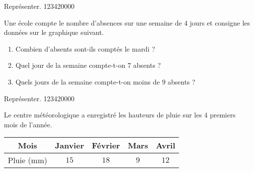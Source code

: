 \begin{pageAD} 


 

\begin{ExoCad}{ Représenter. }{1234}{2}{0}{0}{0}{0}

Une école compte le nombre d'absences sur une semaine de 4 jours et consigne les données sur le graphique suivant.

\begin{minipage}{0.4\linewidth}


\end{minipage}
\begin{minipage}{0.6\linewidth}

\begin{enumerate}[leftmargin=*]
\item Combien d'absents sont-ils comptés le mardi ? 
\item Quel jour de la semaine compte-t-on $7$ absents ?  
\item Quels jours de la semaine compte-t-on moins de $9$ absents ?  
\end{enumerate}
\end{minipage}

\end{ExoCad}



\begin{ExoCad}{ Représenter. }{1234}{2}{0}{0}{0}{0}

Le centre météorologique a enregistré les hauteurs de pluie sur les 4 premiers mois de l'année.

 \begin{center}
 \begin{tabular}{|c|c|c|c|c|}\hline 
  Mois & Janvier & Février & Mars & Avril \\\hline 
  Pluie (mm)& $15$ & $18$ & $9$ & $12$ \\\hline
 \end{tabular}
 \end{center}


\end{ExoCad}
\end{pageAD}
